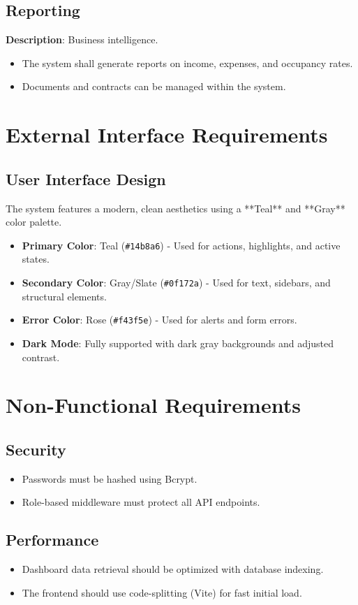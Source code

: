 \documentclass[12pt,a4paper]{article}
\begin{document}
\subsection{Reporting}
\textbf{Description}: Business intelligence.
\begin{itemize}
    \item The system shall generate reports on income, expenses, and occupancy rates.
    \item Documents and contracts can be managed within the system.
\end{itemize}

\section{External Interface Requirements}

\subsection{User Interface Design}
The system features a modern, clean aesthetics using a **Teal** and **Gray** color palette.
\begin{itemize}
    \item \textbf{Primary Color}: Teal (\texttt{\#14b8a6}) - Used for actions, highlights, and active states.
    \item \textbf{Secondary Color}: Gray/Slate (\texttt{\#0f172a}) - Used for text, sidebars, and structural elements.
    \item \textbf{Error Color}: Rose (\texttt{\#f43f5e}) - Used for alerts and form errors.
    \item \textbf{Dark Mode}: Fully supported with dark gray backgrounds and adjusted contrast.
\end{itemize}

\section{Non-Functional Requirements}

\subsection{Security}
\begin{itemize}
    \item Passwords must be hashed using Bcrypt.
    \item Role-based middleware must protect all API endpoints.
\end{itemize}

\subsection{Performance}
\begin{itemize}
    \item Dashboard data retrieval should be optimized with database indexing.
    \item The frontend should use code-splitting (Vite) for fast initial load.
\end{itemize}
\end{document}
